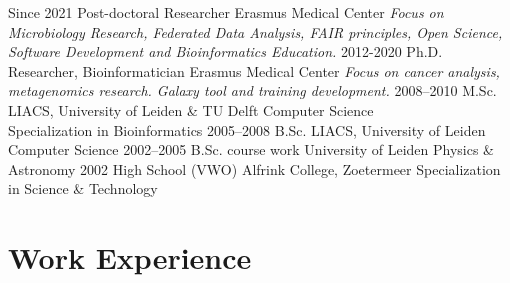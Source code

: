 \documentclass[]{shiltemann-cv}
\begin{document}
\begin{entrylist}
  \entry
    {Since 2021}
    {Post-doctoral Researcher}
    {Erasmus Medical Center}
    {\emph{Focus on Microbiology Research, Federated Data Analysis, FAIR principles, Open Science, Software Development and Bioinformatics Education.}}
  \entry
    {2012-2020}
    {Ph.D. Researcher, Bioinformatician}
    {Erasmus Medical Center}
    {\emph{Focus on cancer analysis, metagenomics research. Galaxy tool and training development.}}
  \entry
    {2008–2010}
    {M.Sc.}
    {LIACS, University of Leiden \& TU Delft}
    {Computer Science\\
    Specialization in Bioinformatics}
  \entry
    {2005–2008}
    {B.Sc.}
    {LIACS, University of Leiden}
    {Computer Science}
  \entry
    {2002–2005}
    {B.Sc. course work}
    {University of Leiden}
    {Physics \& Astronomy}
  \entry
    {2002}
    {High School (VWO)}
    {Alfrink College, Zoetermeer}
    {Specialization in Science \& Technology}
\end{entrylist}

\section{Work Experience}
\end{document}
